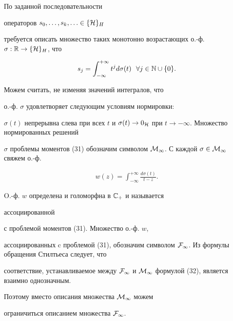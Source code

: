\begin{exam}


По заданной последовательности


операторов $s_0,\dotsc,s_{k}, \dotsc \in \{ {\cal H} \}_H $


требуется описать множество таких монотонно возрастающих о.-ф. $\sigma


:{\Bbb R}\to \{ {\cal H} \}_H $, что


\begin{equation}


s_j=\int_{-\infty }^{+\infty} t^j d\sigma(t)\ \ \forall j \in


{\Bbb N}\cup \{0\}.


\end{equation}


Можем считать, не изменяя значений интегралов, что


о.-ф. $\sigma $ удовлетворяет следующим условиям нормировки:


$\sigma (t)$ непрерывна слева при всех $t$ и $\sigma (t)\to


0_{\cal H}$ при $t\to -\infty $. Множество нормированных решений


$\sigma $ проблемы моментов (31) обозначим символом ${\cal


M}_{\infty} $. С каждой $ \sigma \in {\cal M}_{\infty }$ свяжем о.-ф.


\begin{eqnarray}


w(z)=\int_{-\infty}^{+\infty} \frac {d\sigma(t)}{t-z}.


\end{eqnarray}


O.-ф. $w$ определена и голоморфна в ${\Bbb C}_+$ и называется {\em


ассоциированной} с проблемой моментов (31). Множество о.-ф. $w$,


ассоциированных c проблемой (31), обозначим символом ${\cal


F}_{\infty }$. Из формулы обращения Стилтьеса следует, что


соответствие, устанавливаемое между ${\cal F}_{\infty } $ и ${\cal


M}_{\infty } $ формулой (32), является взаимно однозначным.


Поэтому вместо описания множества ${\cal M}_{\infty }$ можем


ограничиться описанием множества ${\cal F}_{\infty } $.






\end{exam}
